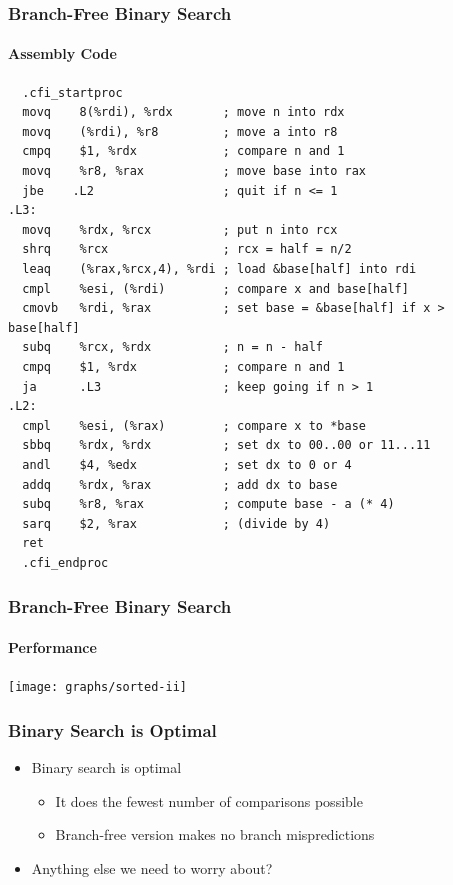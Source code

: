 \documentclass[xcolor=dvipsnames]{beamer}
\begin{document}
\begin{frame}[fragile]
   \frametitle{Branch-Free Binary Search}
   \framesubtitle{Assembly Code}

\tiny
\begin{verbatim}
  .cfi_startproc
  movq    8(%rdi), %rdx       ; move n into rdx
  movq    (%rdi), %r8         ; move a into r8
  cmpq    $1, %rdx            ; compare n and 1
  movq    %r8, %rax           ; move base into rax
  jbe    .L2                  ; quit if n <= 1
.L3:
  movq    %rdx, %rcx          ; put n into rcx
  shrq    %rcx                ; rcx = half = n/2
  leaq    (%rax,%rcx,4), %rdi ; load &base[half] into rdi
  cmpl    %esi, (%rdi)        ; compare x and base[half]
  cmovb   %rdi, %rax          ; set base = &base[half] if x > base[half]
  subq    %rcx, %rdx          ; n = n - half
  cmpq    $1, %rdx            ; compare n and 1
  ja      .L3                 ; keep going if n > 1
.L2:
  cmpl    %esi, (%rax)        ; compare x to *base
  sbbq    %rdx, %rdx          ; set dx to 00..00 or 11...11
  andl    $4, %edx            ; set dx to 0 or 4 
  addq    %rdx, %rax          ; add dx to base
  subq    %r8, %rax           ; compute base - a (* 4)
  sarq    $2, %rax            ; (divide by 4)
  ret
  .cfi_endproc
\end{verbatim}
\end{frame}

\begin{frame}[fragile]
   \frametitle{Branch-Free Binary Search}
   \framesubtitle{Performance}

   \begin{center}
     \texttt{[image: graphs/sorted-ii]}
   \end{center}
\end{frame}


\begin{frame}
   \frametitle{Binary Search is Optimal}

   \begin{itemize}[<+->]
     \item Binary search is optimal 
     \begin{itemize}
       \item It does the fewest number of comparisons possible
       \item Branch-free version makes no branch mispredictions
     \end{itemize}
     \item Anything else we need to worry about?
   \end{itemize}
\end{frame}
\end{document}
